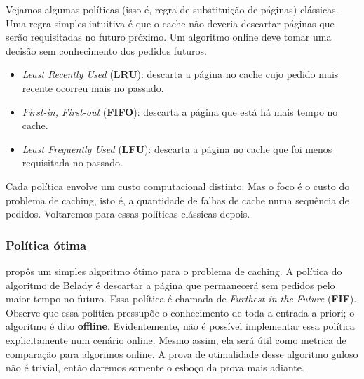 Vejamos algumas políticas (isso é, regra de substituição de páginas) clássicas. Uma regra simples intuitiva é que o cache não deveria descartar páginas que serão requisitadas no futuro próximo. Um algoritmo online deve tomar uma decisão sem conhecimento dos pedidos futuros. 

\begin{itemize}
  \item \textit{Least Recently Used} (\textbf{LRU}): descarta a página no cache cujo pedido mais recente ocorreu mais no passado. \\

  \item \textit{First-in, First-out} (\textbf{FIFO}): descarta a página que está há mais tempo no cache. \\

  \item \textit{Least Frequently Used} (\textbf{LFU}): descarta a página no cache que foi menos requisitada no passado.
\end{itemize}

Cada política envolve um custo computacional distinto. Mas o foco é o custo do problema de caching, isto é, a quantidade de falhas de cache numa sequência de pedidos. Voltaremos para essas políticas clássicas depois.

\subsubsection{Política ótima}

\textcite{Belady66} propôs um simples algoritmo ótimo para o problema de caching. A política do algoritmo de Belady é descartar a página que permanecerá sem pedidos pelo maior tempo no futuro. Essa política é chamada de \textit{Furthest-in-the-Future} (\textbf{FIF}). Observe que essa política pressupõe o conhecimento de toda a entrada a priori; o algoritmo é dito \textbf{offline}. Evidentemente, não é possível implementar essa política explicitamente num cenário online. Mesmo assim, ela será útil como metrica de comparação para algorimos online. A prova de otimalidade desse algoritmo guloso não é trivial, então daremos somente o esboço da prova mais adiante.

